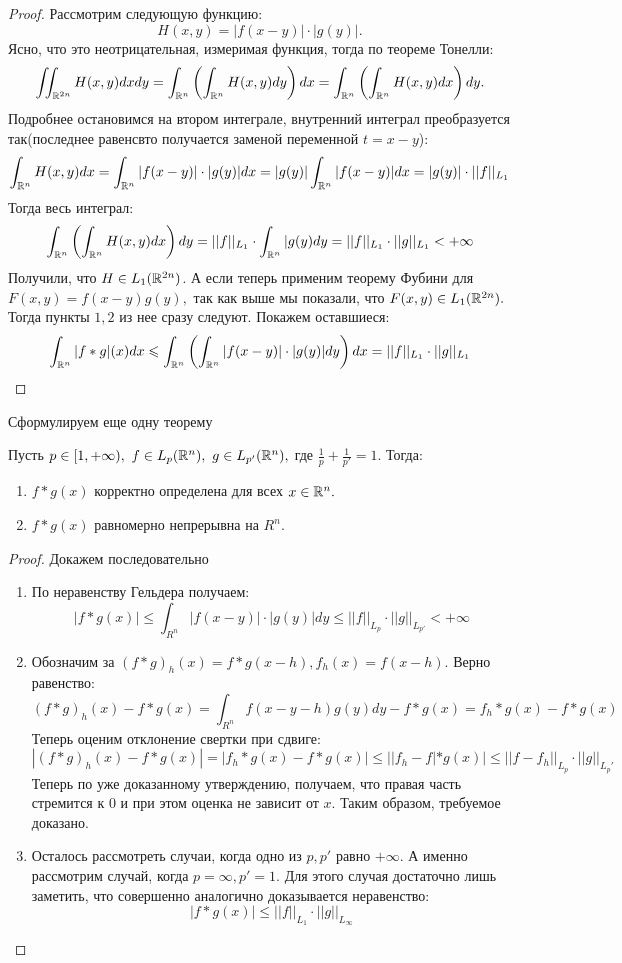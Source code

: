 \begin{proof}
    Рассмотрим следующую функцию:
    $$H(x, y) = |f(x - y)| \cdot |g(y)|.$$
    Ясно, что это неотрицательная, измеримая функция, тогда по теореме Тонелли:
    $$\iint_{\mathbb{R}^{2n}}H(x, y) dx dy = \int_{\mathbb{R}^n}\left( \int_{\mathbb{R}^n} H(x, y) dy\right) dx = \int_{\mathbb{R}^n}\left( \int_{\mathbb{R}^n} H(x, y) dx\right) dy.$$
    Подробнее остановимся на втором интеграле, внутренний интеграл преобразуется так(последнее равенсвто получается заменой переменной $t = x-y$):
    $$\int_{\mathbb{R}^n} H(x, y) dx = \int_{\mathbb{R}^n} |f(x - y)| \cdot |g(y)| dx = |g(y)| \int_{\mathbb{R}^n}|f(x - y)|dx = |g(y)| \cdot ||f||_{L_1}$$
    Тогда весь интеграл:
    $$ \int_{\mathbb{R}^n}\left( \int_{\mathbb{R}^n} H(x, y) dx\right) dy = ||f||_{L_1} \cdot  \int_{\mathbb{R}^n} |g(y) dy = ||f||_{L_1} \cdot ||g||_{L_1} < + \infty$$
    Получили, что $H \in L_1(\mathbb{R}^{2n})$. А если теперь применим теорему Фубини для $F(x, y) = f(x - y) g(y),$ так как выше мы показали, что $F(x, y) \in L_1(\mathbb{R}^{2n}).$ Тогда пункты $1, 2$ из нее сразу следуют. Покажем оставшиеся:
    $$\int_{\mathbb{R}^n}|f*g|(x) dx \leqslant \int_{\mathbb{R}^n}\left( \int_{\mathbb{R}^n} |f(x - y)| \cdot |g(y)| dy \right) dx = ||f||_{L_1} \cdot ||g||_{L_1}$$
\end{proof}

Сформулируем еще одну теорему

\begin{theorem}
    Пусть $p \in [1, +\infty), \ f \in L_p(\mathbb{R}^n), \ g \in L_{p'}(\mathbb{R}^n), $ где $\frac{1}{p} + \frac{1}{p'} = 1.$ Тогда:
    \begin{enumerate}
        \item $f * g(x)$ корректно определена для всех $x \in \mathbb{R}^n.$
        \item $f * g(x)$ равномерно непрерывна на $R^n.$
    \end{enumerate}
\end{theorem}

\begin{proof}
Докажем последовательно
    \begin{enumerate}
        \item По неравенству Гельдера получаем:
        $$|f * g(x)| \leq \int_{R^n}|f(x - y)| \cdot |g(y)| dy \leq ||f||_{L_p} \cdot ||g||_{L_{p
        '}} < + \infty$$
        \item Обозначим за $(f * g)_h(x) = f * g(x - h), f_h(x) = f(x -h).$ Верно равенство:
        $$(f * g)_h(x) - f * g(x) = \int_{R^n} f(x - y -h) g(y)dy - f*g(x) = f_h * g(x) - f*g(x)$$
        Теперь оценим отклонение свертки при сдвиге:
        $$|(f * g)_h(x) - f * g(x)| = |f_h * g(x) - f*g(x)| \leq ||f_h - f| * g(x)| \leq ||f-f_h||_{L_p} \cdot ||g ||_{L_p'}$$
        Теперь по уже доказанному утверждению,  получаем, что правая часть стремится к $0$ и при этом оценка не зависит от $x.$ Таким образом, требуемое доказано.
        \item Осталось рассмотреть случаи, когда одно из $p, p'$ равно $+\infty.$ А именно рассмотрим случай, когда $p = \infty, p' = 1.$ Для этого случая достаточно лишь заметить, что совершенно аналогично доказывается неравенство:
        $$|f * g(x)| \leq ||f||_{L_1} \cdot ||g||_{L_{\infty}}$$
    \end{enumerate}
\end{proof}

